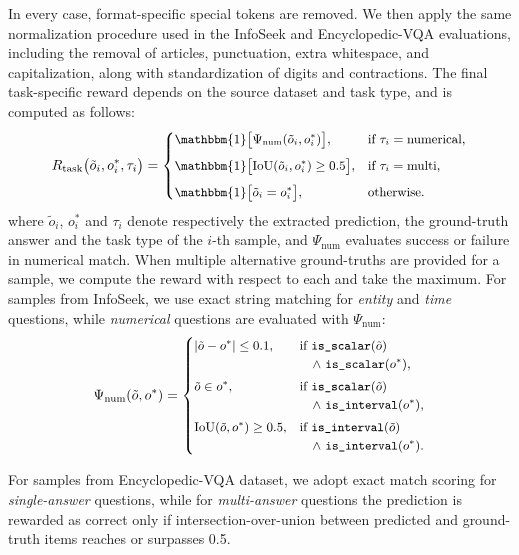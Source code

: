 In every case, format-specific special tokens are removed. We then apply the same normalization procedure used in the InfoSeek and Encyclopedic-VQA evaluations, including the removal of articles, punctuation, extra whitespace, and capitalization, along with standardization of digits and contractions.
The final task-specific reward depends on the source dataset and task type, and is computed as follows:
\begin{equation*}
\small
R_{\text{task}}\big(\tilde{o}_i, {o}_i^*, \tau_i\big) =
\begin{cases}
\mathbbm{1}\big[\Psi_{\text{num}}(\tilde{o}_i,{o}_i^*)\big], & \text{if } \tau_i=\text{numerical},\\[1.5ex]
\mathbbm{1}\big[\text{IoU}(\tilde{o}_i,{o}_i^*)\ge 0.5\big], & \text{if } \tau_i=\text{multi},\\[1.5ex]
\mathbbm{1}\big[\tilde{o}_i = {o}_i^*\big], & \text{otherwise}.
\end{cases}
\end{equation*}
where $\tilde{o}_i$, ${o}_i^*$ and $\tau_i$ denote respectively the extracted prediction, the ground-truth answer and the task type of the $i$-th sample, and $\Psi_{\text{num}}$ evaluates success or failure in numerical match. When multiple alternative ground-truths are provided for a sample, we compute the reward with respect to each and take the maximum.
For samples from InfoSeek, we use exact string matching for \textit{entity} and \textit{time} questions, while \textit{numerical} questions are evaluated with $\Psi_{\text{num}}$:
\begin{equation*}
\small
\Psi_{\text{num}}(\tilde{o},{o}^*) =
\begin{cases}
|\tilde{o}-{o}^*|\le 0.1, & \text{if } \texttt{is\_scalar}(\tilde{o}) \\
& \quad \wedge \text{ }\texttt{is\_scalar}({o}^*),\\[1mm]
\tilde{o} \in {o}^*, & \text{if } \texttt{is\_scalar}(\tilde{o}) \\
& \quad \wedge \text{ }\texttt{is\_interval}({o}^*),\\[1mm]
\mathrm{IoU}(\tilde{o},{o}^*)\ge 0.5, & \text{if } \texttt{is\_interval}(\tilde{o}) \\
& \quad \wedge \text{ }\texttt{is\_interval}({o}^*).
\end{cases}
\end{equation*}

For samples from Encyclopedic-VQA dataset, we adopt exact match scoring for \textit{single-answer} questions, while for \textit{multi-answer} questions the prediction is rewarded as correct only if intersection-over-union between predicted and ground-truth items reaches or surpasses 0.5. 

